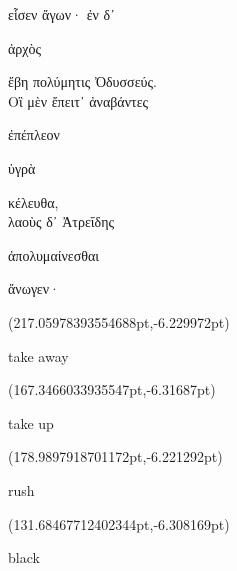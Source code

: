 \documentclass{ransom}
\begin{document}
\begin{foreignpage}
\begin{graytext}
εἷσεν ἄγων· ἐν δ᾽ \begin{whitetext}ἀρχὸς\end{whitetext} ἔβη πολύμητις Ὀδυσσεύς.\\
Οἳ μὲν ἔπειτ᾽ ἀναβάντες \begin{whitetext}ἐπέπλεον\end{whitetext} \begin{whitetext}ὑγρὰ\end{whitetext} κέλευθα,\\
λαοὺς δ᾽ Ἀτρεΐδης \begin{whitetext}ἀπολυμαίνεσθαι\end{whitetext} ἄνωγεν·\\

\end{graytext}

{\linespread{1.0}\footnotesize \begin{textblock*}{46.5231pt}(217.05978393554688pt,\pdfpageheight-503.3775939941406pt-6.229972pt)\parbox[b]{46.5231pt}{\begin{blacktext}\begin{latin}take away\end{latin}\end{blacktext}}\end{textblock*}
\begin{textblock*}{37.08939pt}(167.3466033935547pt,\pdfpageheight-449.3775939941406pt-6.31687pt)\parbox[b]{37.08939pt}{\begin{blacktext}\begin{latin}take up\end{latin}\end{blacktext}}\end{textblock*}
\begin{textblock*}{40.16776pt}(178.9897918701172pt,\pdfpageheight-395.3775939941406pt-6.221292pt)\parbox[b]{40.16776pt}{\begin{blacktext}\begin{latin}rush\end{latin}\end{blacktext}}\end{textblock*}
\begin{textblock*}{43.64334pt}(131.68467712402344pt,\pdfpageheight-395.3775939941406pt-6.308169pt)\parbox[b]{43.64334pt}{\begin{blacktext}\begin{latin}black\end{latin}\end{blacktext}}\end{textblock*}
}
\end{foreignpage}
\end{document}
